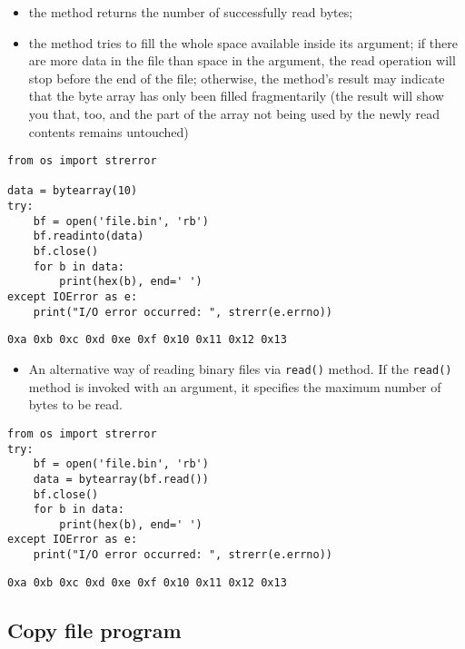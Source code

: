 \documentclass[11pt]{article}
\begin{document}
\begin{itemize}
\item the method returns the number of successfully read bytes;

\item the method tries to fill the whole space available inside its
argument; if there are more data in the file than space in the
argument, the read operation will stop before the end of the file;
otherwise, the method’s result may indicate that the byte array has
only been filled fragmentarily (the result will show you that, too,
and the part of the array not being used by the newly read contents
remains untouched)
\end{itemize}

\begin{verbatim}
from os import strerror

data = bytearray(10)
try:
	bf = open('file.bin', 'rb')
	bf.readinto(data)
	bf.close()
	for b in data:
		print(hex(b), end=' ')
except IOError as e:
	print("I/O error occurred: ", strerr(e.errno))
\end{verbatim}

\begin{verbatim}
0xa 0xb 0xc 0xd 0xe 0xf 0x10 0x11 0x12 0x13 
\end{verbatim}

\vspace{10 mm}

\begin{itemize}
\item An alternative way of reading binary files via \texttt{read()} method. If
the \texttt{read()} method is invoked with an argument, it specifies the
maximum number of bytes to be read.
\end{itemize}

\begin{verbatim}
from os import strerror
try:
	bf = open('file.bin', 'rb')
	data = bytearray(bf.read())
	bf.close()
	for b in data:
		print(hex(b), end=' ')
except IOError as e:
	print("I/O error occurred: ", strerr(e.errno))
\end{verbatim}

\begin{verbatim}
0xa 0xb 0xc 0xd 0xe 0xf 0x10 0x11 0x12 0x13 
\end{verbatim}

\newpage

\subsection{Copy file program}
\label{sec:org082eb67}
\end{document}
